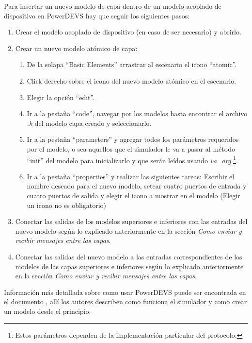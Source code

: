 \documentclass[10pt,a4paper]{article}
\begin{document}
Para insertar un nuevo modelo de capa dentro de un modelo acoplado de dispositivo en PowerDEVS hay que seguir los siguientes pasos:

\begin{enumerate}
\item Crear el modelo acoplado de dispositivo (en caso de ser necesario) y abrirlo.
\item Crear un nuevo modelo atómico de capa:
\begin{enumerate}
\item De la solapa ``Basic Elements'' arrastrar al escenario el icono ``atomic''.
\item Click derecho sobre el icono del nuevo modelo atómico en el escenario.
\item Elegir la opción  ``edit''.
\item Ir a la pestaña ``code'', navegar por los modelos hasta encontrar el archivo \textit{.h} del modelo capa creado y seleccionarlo.
\item Ir a la pestaña ``parameters'' y agregar todos los parámetros requeridos por el modelo, o sea aquellos que el simulador le va a pasar al método ``init'' del modelo para inicializarlo y que serán leídos usando \textit{va\_arg} \footnote{Estos parámetros dependen de la implementación particular del protocolo.}.
\item Ir a la pestaña ``properties'' y realizar las siguientes tareas: Escribir el nombre deseado para el nuevo modelo, setear cuatro puertos de entrada y cuatro puertos de salida y elegir el icono a mostrar en el modelo (Elegir un icono no es obligatorio)
\end{enumerate}
\item Conectar las salidas de los modelos superiores e inferiores con las entradas del nuevo modelo según lo explicado anteriormente en la sección \textit{Como enviar y recibir mensajes entre las capas}.
\item Conectar las salidas del nuevo modelo a las entradas correspondientes de los modelos de las capas superiores e inferiores según lo explicado anteriormente en la sección \textit{Como enviar y recibir mensajes entre las capas}.
\end{enumerate}

Información más detallada sobre como usar PowerDEVS puede ser encontrada en el documento \cite{bergero2011powerdevs}, allí los autores describen como funciona el simulador y como crear un modelo desde el principio. \\
\end{document}
